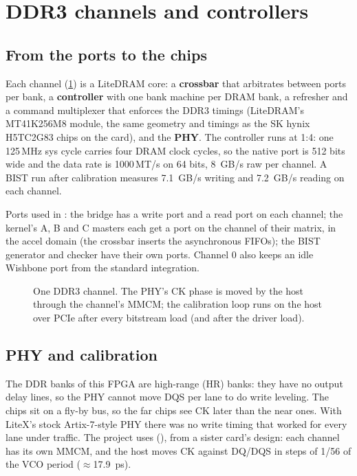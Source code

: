 \section{DDR3 channels and controllers}
\label{sec:ddr}

\subsection{From the ports to the chips}
Each channel (\cref{fig:ddr}) is a LiteDRAM core: a \textbf{crossbar} that arbitrates between ports per bank, a
\textbf{controller} with one bank machine per DRAM bank, a refresher and a command multiplexer that enforces the
DDR3 timings (LiteDRAM's MT41K256M8 module, the same geometry and timings as the SK hynix H5TC2G83 chips on the card),
and the \textbf{PHY}. The controller runs at 1:4: one 125\,MHz sys cycle carries four DRAM clock cycles, so the native
port is 512 bits wide and the data rate is 1000\,MT/s on 64 bits, \SI{8}{GB/s} raw per channel. A BIST run after
calibration measures \SI{7.1}{GB/s} writing and \SI{7.2}{GB/s} reading on each channel.

Ports used in : the bridge has a write port and a read port on each channel; the kernel's A, B and C
masters each get a port on the channel of their matrix, in the accel domain (the crossbar inserts the asynchronous
FIFOs); the BIST generator and checker have their own ports. Channel 0 also keeps an idle Wishbone port from the
standard integration.

\begin{figure}[t]
  \centering
  \resizebox{\linewidth}{!}{}
  \caption{One DDR3 channel. The PHY's CK phase is moved by the host through the channel's MMCM; the calibration
    loop runs on the host over PCIe after every bitstream load (and after the driver load).}
  \label{fig:ddr}
\end{figure}

\subsection{PHY and calibration}
The DDR banks of this FPGA are high-range (HR) banks: they have no output delay lines, so the PHY cannot move DQS per
lane to do write leveling. The chips sit on a fly-by bus, so the far chips see CK later than the near ones. With
LiteX's stock Artix-7-style PHY there was no write timing that worked for every lane under traffic. The project
uses  (), from a sister card's design: each channel has its own
MMCM, and the host moves CK against DQ/DQS in steps of 1/56 of the VCO period (\(\approx\)\SI{17.9}{ps}).

